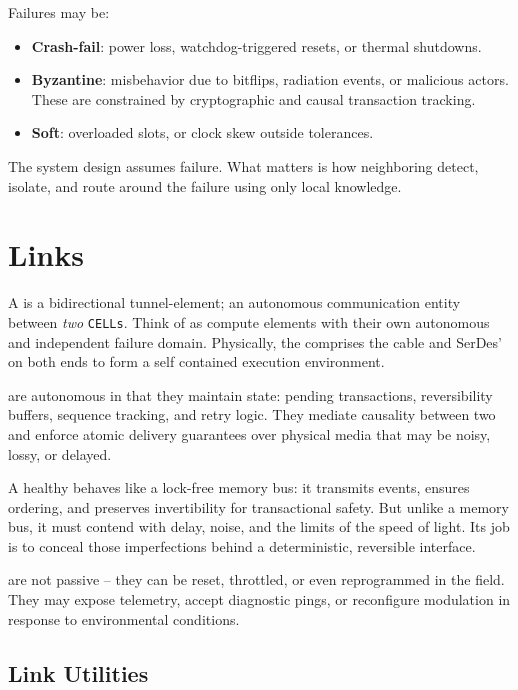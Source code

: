 \documentclass[../OAE-SPEC-MAIN.tex]{subfiles}
\begin{document}
Failures may be:
\begin{itemize}
\item \textbf{Crash-fail}: power loss, watchdog-triggered resets, or thermal shutdowns.
\item \textbf{Byzantine}: misbehavior due to bitflips, radiation events, or malicious actors. These are constrained by cryptographic and causal transaction tracking.
\item \textbf{Soft}: overloaded slots, or clock skew outside tolerances.
\end{itemize}

The system design assumes failure. What matters is how neighboring \CELLs detect, isolate, and route around the failure using only local knowledge.





\section{Links}

A \LINK is a bidirectional tunnel-element; an autonomous communication entity between  \emph{two} \texttt{CELLs}. Think of  \LINKs as compute elements with their own autonomous and independent failure domain. Physically, the \LINK comprises the cable and SerDes' on both ends to form a self contained execution environment.

\LINKs are autonomous in that they maintain state: pending transactions, reversibility buffers, sequence tracking, and retry logic. They mediate causality between two \CELLs and enforce atomic delivery guarantees over physical media that may be noisy, lossy, or delayed.

A healthy \LINK behaves like a lock-free memory bus: it transmits events, ensures ordering, and preserves invertibility for transactional safety. But unlike a memory bus, it must contend with delay, noise, and the limits of the speed of light. Its job is to conceal those imperfections behind a deterministic, reversible interface.

\LINKs are not passive -- they can be reset, throttled, or even reprogrammed in the field. They may expose telemetry, accept diagnostic pings, or reconfigure modulation in response to environmental conditions.

\subsection{Link Utilities}
\end{document}
